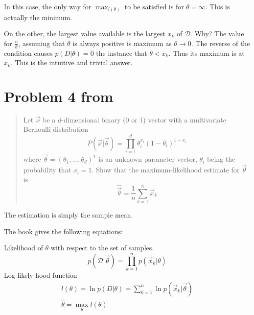 \documentclass[11pt]{article}
\begin{document}
In this case, the only way for $\max_{l(\theta)}$ to be satisfied is for $\theta = \infty$.   This is actually the minimum.  

On the other, the largest value available is the largest $x_k$ of $\mathcal{D}$.  Why?  The value for $\frac{n}{\theta}$, assuming that $\theta$ is always positive is maximum as $\theta \to 0$.  The reverse of the condition causes $p(D|\theta) = 0$ the instance that $\theta < x_k$.  Thus its maximum is at $x_k$.   This is the intuitive and trivial answer.  


\section{Problem 4 from \cite[141]{duda-hart-stork}}
\begin{quote}
	Let $\vec{x}$ be a $d$-dimensional binary (0 or 1) vector with a multivariate Bernoulli distribution
	\begin{equation}
	P (\vec{x} | \vec{\theta}) = \prod _{i=1}^d \theta_i ^{x_i} (1 - \theta_i) ^{1-x_i}
	\end{equation}
	where $\vec{\theta} = ( \theta_1, ..., \theta_d)^T$ is an unknown parameter vector, $\theta_i$ being the probability that $x_i = 1$.  Show that the maximum-likelihood estimate for $\vec{\theta}$ is 
	\begin{equation}
		\hat{\vec{\theta}} = \frac{1}{n} \sum_{k=1}^{n} \vec{x} _k
	\end{equation}
\end{quote}

The estimation is simply the sample mean. 


The book gives the following equations:

Likelihood of  $\theta$  with respect to the set of samples. \\
\begin{equation}
	p(\mathcal{D} | \vec{\theta}) = \prod _{k=1}^n p( \vec{x}_k | \theta)  \label{likelihood}
\end{equation}
	\textrm{ Log likely hood function} 
\begin{eqnarray}
	l(\theta) = \ln p(D | \theta) = \sum _{k=1} ^n \ln p(\vec{x}_k | \vec{\theta}) \label{logLikelihood}\\
	\hat{\theta} = \max _\theta l(\theta) \label{maxParametersMLE}
\end{eqnarray}

\end{document}
